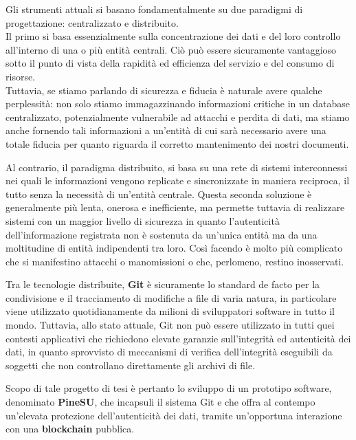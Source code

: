 Gli strumenti attuali si basano fondamentalmente su due paradigmi
di progettazione: centralizzato e distribuito.
\\
Il primo si basa essenzialmente sulla concentrazione dei dati e del loro controllo
all'interno di una o più entità centrali. Ciò può essere sicuramente vantaggioso sotto
il punto di vista della rapidità ed efficienza del servizio e del consumo di risorse.
\\
Tuttavia, se stiamo parlando di sicurezza e fiducia è naturale avere qualche perplessità:
non solo stiamo immagazzinando informazioni critiche in un database centralizzato,
potenzialmente vulnerabile ad attacchi e perdita di dati, ma stiamo anche fornendo
tali informazioni a un'entità di cui sarà necessario avere una totale fiducia per quanto
riguarda il corretto mantenimento dei nostri documenti.

Al contrario, il paradigma distribuito, si basa su una rete di sistemi interconnessi nei
quali le informazioni vengono replicate e sincronizzate in maniera reciproca, il tutto senza
la necessità di un'entità centrale. 
Questa seconda soluzione è generalmente più lenta, onerosa e inefficiente,
ma permette tuttavia di realizzare sistemi con un maggior livello di sicurezza in quanto
l'autenticità dell'informazione registrata non è sostenuta da un'unica entità ma da una
moltitudine di entità indipendenti tra loro.
Così facendo è molto più complicato che si manifestino attacchi o manomissioni
o che, perlomeno, restino inosservati.

Tra le tecnologie distribuite, \textbf{Git} è sicuramente lo standard de facto per la condivisione
e il tracciamento di modifiche a file di varia natura, in particolare viene utilizzato
quotidianamente da milioni di sviluppatori software in tutto il mondo.
Tuttavia, allo stato attuale, Git non può essere utilizzato in tutti quei
contesti applicativi che richiedono elevate garanzie sull'integrità ed autenticità dei dati,
in quanto sprovvisto di meccanismi di verifica dell'integrità eseguibili da soggetti
che non controllano direttamente gli archivi di file.

Scopo di tale progetto di tesi è pertanto lo sviluppo di un prototipo software,
denominato \textbf{PineSU}, che incapsuli il sistema Git e che offra al contempo un'elevata
protezione dell'autenticità dei dati, tramite un'opportuna interazione con una \textbf{blockchain}
pubblica.

